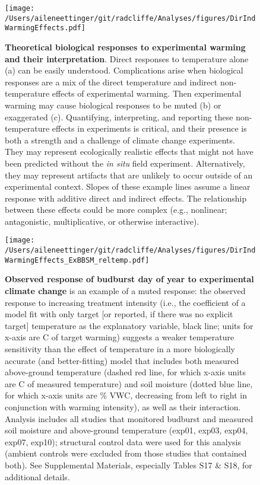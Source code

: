 \documentclass{article}
\begin{document}
 \begin{figure}[h]
\centering
 \texttt{[image: /Users/aileneettinger/git/radcliffe/Analyses/figures/DirIndWarmingEffects.pdf]} 
 \caption{\textbf{Theoretical biological responses to experimental warming and their interpretation}. Direct responses to temperature alone (a) can be easily understood. Complications arise when biological responses are a mix of the direct temperature and indirect non-temperature effects of experimental warming. Then experimental warming may cause biological responses to be muted (b) or exaggerated (c). Quantifying, interpreting, and reporting these non-temperature effects in experiments is critical, and their presence is both a strength and a challenge of climate change experiments. They may represent ecologically realistic effects that might not have been predicted without the \emph{in situ} field experiment. Alternatively, they may represent artifacts that are unlikely to occur outside of an experimental context. Slopes of these example lines assume a linear response with additive direct and indirect effects. The relationship between these effects could be more complex (e.g., nonlinear; antagonistic, multiplicative, or otherwise interactive).} 
\label{fig:biolimp}
\end{figure}

\begin{figure}[h]
\centering
 \texttt{[image: /Users/aileneettinger/git/radcliffe/Analyses/figures/DirIndWarmingEffects\_ExBBSM\_reltemp.pdf]} 
 \caption{\textbf{Observed response of budburst day of year to experimental climate change} is an example of a muted response: the observed response to increasing treatment intensity (i.e., the coefficient of a model fit with only target [or reported, if there was no explicit target] temperature as the explanatory variable, black line; units for x-axis are \degree C of target warming) suggests a weaker temperature sensitivity than the effect of temperature in a more biologically accurate (and better-fitting) model that includes both measured above-ground temperature (dashed red line, for which x-axis units are \degree C of measured temperature) and soil moisture (dotted blue line, for which x-axis units are \% VWC, decreasing from left to right in conjunction with warming intensity), as well as their interaction. Analysis includes all studies that monitored budburst and measured soil moisture and above-ground temperature (exp01, exp03, exp04, exp07, exp10); structural control data were used for this analysis (ambient controls were excluded from those studies that contained both). See Supplemental Materials, especially Tables S17 \& S18, for additional details.} 
 
\label{fig:phen}
\end{figure}
 
\end{document}
